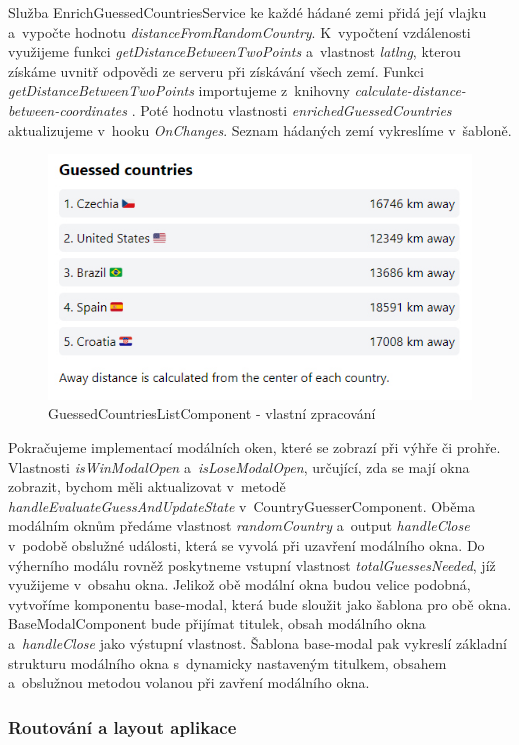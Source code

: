 Služba EnrichGuessedCountriesService ke každé hádané zemi přidá její vlajku a~vypočte hodnotu \emph{distanceFromRandomCountry}. 
K~vypočtení vzdálenosti využijeme funkci \emph{getDistanceBetweenTwoPoints} a~vlastnost \emph{latlng}, kterou získáme uvnitř odpovědi ze serveru při získávání všech zemí. 
Funkci \emph{getDistanceBetweenTwoPoints} importujeme z~knihovny \emph{calculate-distance-between-coordinates} \cite{distancebetweencoordinates}. 
Poté hodnotu vlastnosti \emph{enrichedGuessedCountries} aktualizujeme v~hooku \emph{OnChanges}. Seznam hádaných zemí vykreslíme v~šabloně.

\begin{figure}[htb]
	\centering
		\includegraphics[width=.7\textwidth]{images/GuessedCountriesList.jpg}
	\caption[GuessedCountriesListComponent]{GuessedCountriesListComponent - vlastní zpracování}
	\label{fig:angularguessedcountrieslist}
\end{figure}

Pokračujeme implementací modálních oken, které se zobrazí při výhře či prohře. 
Vlastnosti \emph{isWinModalOpen} a~\emph{isLoseModalOpen}, určující, zda se mají okna zobrazit, bychom měli aktualizovat v~metodě \emph{handleEvaluateGuessAndUpdateState} v~CountryGuesserComponent. 
Oběma modálním oknům předáme vlastnost \emph{randomCountry} a~output \emph{handleClose} v~podobě obslužné události, která se vyvolá při uzavření modálního okna. 
Do výherního modálu rovněž poskytneme vstupní vlastnost \emph{totalGuessesNeeded}, jíž využijeme v~obsahu okna. 
Jelikož obě modální okna budou velice podobná, vytvoříme komponentu base-modal, která bude sloužit jako šablona pro obě okna. 
BaseModalComponent bude přijímat titulek, obsah modálního okna a~\emph{handleClose} jako výstupní vlastnost. 
Šablona base-modal pak vykreslí základní strukturu modálního okna s~dynamicky nastaveným titulkem, obsahem a~obslužnou metodou volanou při zavření modálního okna.

\subsubsection*{Routování a layout aplikace}

